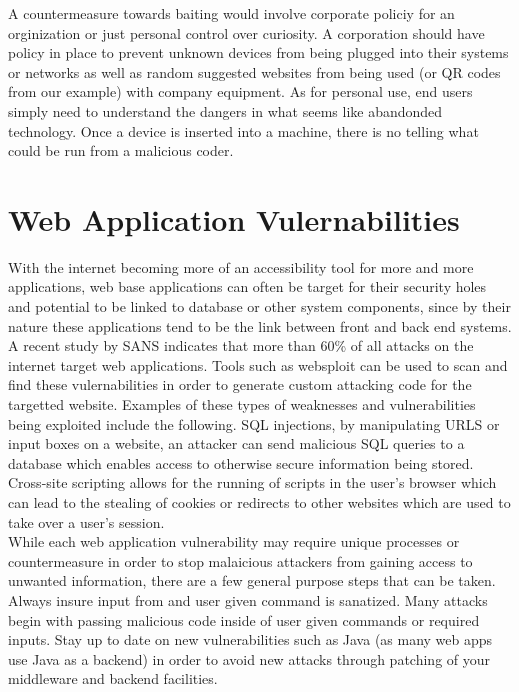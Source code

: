 \documentclass[paper=a4, fontsize=11pt]{scrartcl} %
\numberwithin{equation}{section} %
\numberwithin{figure}{section} %
\numberwithin{table}{section} %
\begin{document}
A countermeasure towards baiting would involve corporate policiy for an 
orginization or just personal control over curiosity. A corporation should
have policy in place to prevent unknown devices from being plugged into their
systems or networks as well as random suggested websites from being used (or
QR codes from our example) with company equipment. As for personal use, 
end users simply need to understand the dangers in what seems like abandonded
technology. Once a device is inserted into a machine, there is no telling what
could be run from a malicious coder. 


\section{Web Application Vulernabilities}
With the internet becoming more of an accessibility tool for more and more
applications, web base applications can often be target for their security 
holes and potential to be linked to database or other system components, since
by their nature these applications tend to be the link between front and
back end systems. A recent study by SANS indicates that more than 60\% of
all attacks on the internet target web applications. Tools such as websploit
can be used to scan and find these vulernabilities in order to generate
custom attacking code for the targetted website. Examples of these types of
weaknesses and vulnerabilities being exploited include the following.
SQL injections, by manipulating URLS or input boxes on a website, an attacker
can send malicious SQL queries to a database which enables access to otherwise
secure information being stored. Cross-site scripting allows for the running
of scripts in the user's browser which can lead to the stealing of cookies
or redirects to other websites which are used to take over a user's session. \\

While each web application vulnerability may require unique processes or
countermeasure in order to stop malaicious attackers from gaining access
to unwanted information, there are a few general purpose steps that can
be taken. Always insure input from and user given command is sanatized. Many
attacks begin with passing malicious code inside of user given commands or
required inputs. Stay up to date on new vulnerabilities such as Java (as many
web apps use Java as a backend) in order to avoid new attacks through
patching of your middleware and backend facilities.
\end{document}
